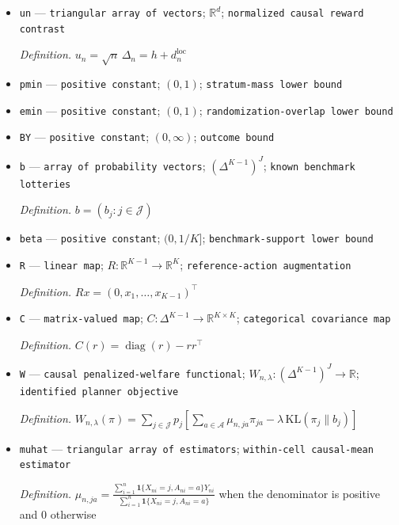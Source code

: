 \documentclass{article}
\begin{document}
\begin{itemize}
  \par\smallskip\noindent\emph{Definition.} \(\rho_n\downarrow0\)
  \item \texttt{un} --- \texttt{triangular array of vectors}; \(\mathbb R^d\); \texttt{normalized causal reward contrast}
  \par\smallskip\noindent\emph{Definition.} \(u_n=\sqrt n\,\Delta_n=h+d_n^{\mathrm{loc}}\)
  \item \texttt{pmin} --- \texttt{positive constant}; \((0,1)\); \texttt{stratum-\allowbreak{}mass lower bound}
  \item \texttt{emin} --- \texttt{positive constant}; \((0,1)\); \texttt{randomization-\allowbreak{}overlap lower bound}
  \item \texttt{BY} --- \texttt{positive constant}; \((0,\infty)\); \texttt{outcome bound}
  \item \texttt{b} --- \texttt{array of probability vectors}; \((\Delta^{K-1})^J\); \texttt{known benchmark lotteries}
  \par\smallskip\noindent\emph{Definition.} \(b=(b_j:j\in\mathcal J)\)
  \item \texttt{beta} --- \texttt{positive constant}; \((0,1/K]\); \texttt{benchmark-\allowbreak{}support lower bound}
  \item \texttt{R} --- \texttt{linear map}; \(R:\mathbb R^{K-1}\to\mathbb R^K\); \texttt{reference-\allowbreak{}action augmentation}
  \par\smallskip\noindent\emph{Definition.} \(Rx=(0,x_1,\ldots,x_{K-1})^{\top}\)
  \item \texttt{C} --- \texttt{matrix-\allowbreak{}valued map}; \(C:\Delta^{K-1}\to\mathbb R^{K\times K}\); \texttt{categorical covariance map}
  \par\smallskip\noindent\emph{Definition.} \(C(r)=\operatorname{diag}(r)-rr^{\top}\)
  \item \texttt{W} --- \texttt{causal penalized-\allowbreak{}welfare functional}; \(W_{n,\lambda}:(\Delta^{K-1})^J\to\mathbb R\); \texttt{identified planner objective}
  \par\smallskip\noindent\emph{Definition.} \(W_{n,\lambda}(\pi)=\sum_{j\in\mathcal J}p_j[\sum_{a\in\mathcal A}\mu_{n,ja}\pi_{ja}-\lambda\,\mathrm{KL}(\pi_j\|b_j)]\)
  \item \texttt{muhat} --- \texttt{triangular array of estimators}; \texttt{within-\allowbreak{}cell causal-\allowbreak{}mean estimator}
  \par\smallskip\noindent\emph{Definition.} \(\widehat\mu_{n,ja}=\frac{\sum_{i=1}^n\mathbf 1\{X_{ni}=j,A_{ni}=a\}Y_{ni}}{\sum_{i=1}^n\mathbf 1\{X_{ni}=j,A_{ni}=a\}}\) when the denominator is positive and \(0\) otherwise

\end{itemize}
\end{document}
